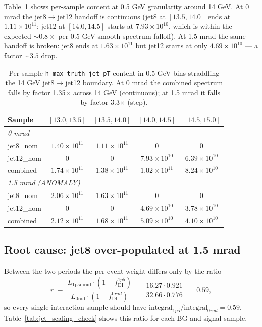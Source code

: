 \documentclass[11pt,a4paper]{article}
\begin{document}
Table~\ref{tab:bg_14gev_zoom} shows per-sample content at 0.5 GeV granularity around 14 GeV. At 0 mrad the jet8$\rightarrow$jet12 handoff is continuous (jet8 at $[13.5, 14.0]$ ends at $1.11\times10^{11}$; jet12 at $[14.0, 14.5]$ starts at $7.93\times10^{10}$, which is within the expected $\sim 0.8\times$-per-0.5-GeV smooth-spectrum falloff). At 1.5 mrad the same handoff is broken: jet8 ends at $1.63\times10^{11}$ but jet12 starts at only $4.69\times10^{10}$ --- a factor $\sim 3.5$ drop.

\begin{table}[H]
\centering
\small
\begin{tabular}{l|cccc}
\toprule
Sample         & $[13.0, 13.5]$   & $[13.5, 14.0]$   & $[14.0, 14.5]$   & $[14.5, 15.0]$  \\
\midrule
\multicolumn{5}{l}{\textit{0 mrad}} \\
jet8\_nom      & $1.40\times10^{11}$ & $1.11\times10^{11}$ & $0$                & $0$              \\
jet12\_nom     & $0$                & $0$                & $7.93\times10^{10}$ & $6.39\times10^{10}$ \\
combined       & $1.74\times10^{11}$ & $1.38\times10^{11}$ & $1.02\times10^{11}$ & $8.24\times10^{10}$ \\
\midrule
\multicolumn{5}{l}{\textit{1.5 mrad (ANOMALY)}} \\
jet8\_nom      & $2.06\times10^{11}$ & $1.63\times10^{11}$ & $0$                & $0$              \\
jet12\_nom     & $0$                & $0$                & $4.69\times10^{10}$ & $3.78\times10^{10}$ \\
combined       & $2.12\times10^{11}$ & $1.68\times10^{11}$ & $5.09\times10^{10}$ & $4.10\times10^{10}$ \\
\bottomrule
\end{tabular}
\caption{Per-sample \texttt{h\_max\_truth\_jet\_pT} content in 0.5 GeV bins straddling the 14 GeV jet8$\rightarrow$jet12 boundary. At 0 mrad the combined spectrum falls by factor 1.35$\times$ across 14 GeV (continuous); at 1.5 mrad it falls by factor 3.3$\times$ (step).}
\label{tab:bg_14gev_zoom}
\end{table}

\subsection{Root cause: jet8 over-populated at 1.5 mrad}

Between the two periods the per-event weight differs only by the ratio
\[
r \;\equiv\; \frac{L_{\mathrm{1p5mrad}} \cdot (1 - f_{\mathrm{DI}}^{1p5})}{L_{\mathrm{0rad}} \cdot (1 - f_{\mathrm{DI}}^{0rad})} \;=\; \frac{16.27 \cdot 0.921}{32.66 \cdot 0.776} \;=\; 0.59,
\]
so every single-interaction sample should have $\mathrm{integral}_{1p5} / \mathrm{integral}_{0rad} = 0.59$. Table~\ref{tab:jet_scaling_check} shows this ratio for each BG and signal sample.
\end{document}
